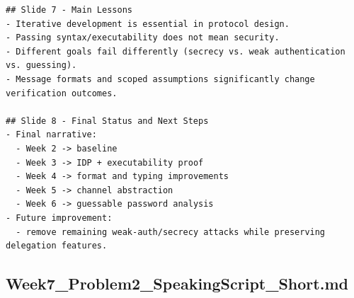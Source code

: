 \documentclass[11pt,a4paper]{article}
\begin{document}
\begin{lstlisting}
## Slide 7 - Main Lessons
- Iterative development is essential in protocol design.
- Passing syntax/executability does not mean security.
- Different goals fail differently (secrecy vs. weak authentication vs. guessing).
- Message formats and scoped assumptions significantly change verification outcomes.

## Slide 8 - Final Status and Next Steps
- Final narrative:
  - Week 2 -> baseline
  - Week 3 -> IDP + executability proof
  - Week 4 -> format and typing improvements
  - Week 5 -> channel abstraction
  - Week 6 -> guessable password analysis
- Future improvement:
  - remove remaining weak-auth/secrecy attacks while preserving delegation features.
\end{lstlisting}

\subsection{Week7\_Problem2\_SpeakingScript\_Short.md}
\end{document}
